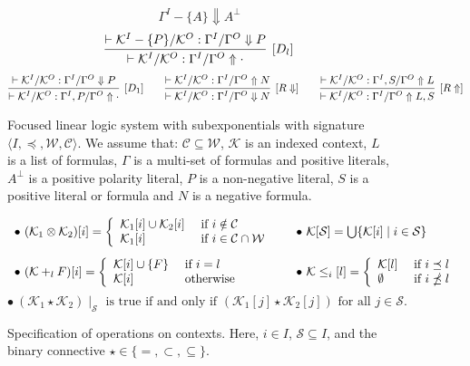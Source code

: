 \begin{figure}[t]
{$${\Gamma^I - \{A\} \Downarrow A^\bot}{}
$$
\vspace{-2.5mm}
$$
\infer[\text{[$D_l$]}]{\vdash
\mathcal{K}^I / \mathcal{K}^O: \Gamma^I / \Gamma^O \Uparrow \cdot}{\vdash
\mathcal{K}^I - \{P\} / \mathcal{K}^O : \Gamma^I / \Gamma^O \Downarrow P}
$$
\vspace{-2.5mm}
$$
\infer[\text{[$D_1$]}]{\vdash \mathcal{K}^I / \mathcal{K}^O : \Gamma^I, P /
\Gamma^O \Uparrow \cdot}{\vdash \mathcal{K}^I / \mathcal{K}^O  : \Gamma^I /
\Gamma^O \Downarrow P}
\qquad
\infer[\text{[$R\Downarrow$]}]{\vdash \mathcal{K}^I / \mathcal{K}^O : \Gamma^I /
\Gamma^O \Downarrow N}{\vdash \mathcal{K}^I / \mathcal{K}^O : \Gamma^I /
\Gamma^O \Uparrow N}
\qquad
\infer[\text{[$R\Uparrow$]}]{\vdash \mathcal{K}^I / \mathcal{K}^O : \Gamma^I /
\Gamma^O \Uparrow L, S}{\vdash \mathcal{K}^I / \mathcal{K}^O : \Gamma^I, S /
\Gamma^O \Uparrow L}
$$
}
\caption{Focused linear logic system with subexponentials with signature
$\langle I, \preceq, \mathcal{W}, \mathcal{C} \rangle$. We assume that: $\mathcal{C} \subseteq
\mathcal{W}$, $\mathcal{K}$ is an indexed context, $L$ is a list of formulas, $\Gamma$ is a multi-set of
formulas and positive literals, $A^\bot$ is a positive polarity literal,
$P$ is a non-negative literal, $S$ is a positive literal or formula and $N$
is a negative formula.}
\label{figure:sellf}
\vspace{-5mm}
\end{figure}

\begin{figure}[t]
{\small
\[
\begin{array}{l@{\qquad}l}
\bullet~(\mathcal{K}_1 \otimes \mathcal{K}_2) [i] = \left\{
\begin{array}{ll}
 \mathcal{K}_1[i] \cup \mathcal{K}_2[i] & \hbox{ if }
i \notin \mathcal{C}\\
 \mathcal{K}_1[i]  & \hbox{ if } i \in \mathcal{C} \cap \mathcal{W}
\end{array}
\right.
& 
\bullet~\mathcal{K}[\mathcal{S}] =
\bigcup\{\mathcal{K}[i]\;|\;i\in \mathcal{S}\}\\[15pt]
\bullet~(\mathcal{K} +_l F) [i] = \left\{
\begin{array}{ll}
 \mathcal{K}[i] \cup \{F\} & \hbox{ if } i = l\\
 \mathcal{K}[i]  & \hbox{ otherwise }
\end{array}
\right.
&
\bullet~ \mathcal{K} \leq_i[l] = \left\{
\begin{array}{ll}
 \mathcal{K}[l] & \hbox{ if } i \preceq l\\
 \emptyset & \hbox{ if } i \npreceq l 
\end{array}
\right.
\end{array}
\]
\[
\bullet~ (\mathcal{K}_1 \star \mathcal{K}_2)\mid_\mathcal{S}
\textrm{ is true if and only if }(\mathcal{K}_1[j]
\star \mathcal{K}_2[j]) \textrm{ for all $j \in \mathcal{S}$.}
\]
}
\caption{Specification of operations on contexts. Here, 
$i \in I$, $\mathcal{S} \subseteq I$, and the 
binary connective $\star \in \{=, \subset, \subseteq\}$.}
\label{Fig:Contexts}
\vspace{-5mm}
\end{figure}

